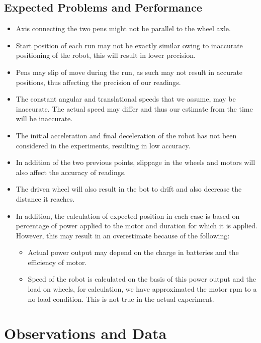 \documentclass[10pt,a4paper]{article}
\begin{document}
	\subsection{Expected Problems and Performance}
		\begin{itemize}
			\item Axis connecting the two pens might not be parallel to the wheel axle.
			\item Start position of each run may not be exactly similar owing to inaccurate positioning of the robot, this will result in lower precision.
			\item Pens may slip of move during the run, as such may not result in accurate positions, thus affecting the precision of our readings.
			\item The constant angular and translational speeds that we assume, may be inaccurate. The actual speed may differ and thus our estimate from the time will be inaccurate.
			\item The initial acceleration and final deceleration of the robot has not been considered in the experiments, resulting in low accuracy.
			\item In addition of the two previous points, slippage in the wheels and motors will also affect the accuracy of readings.
			\item The driven wheel will also result in the bot to drift and also decrease the distance it reaches.
			\item In addition, the calculation of expected position in each case is based on percentage of power applied to the motor and duration for which it is applied. However, this may result in an overestimate because of the following:
				\begin{itemize}
					\item Actual power output may depend on the charge in batteries and the efficiency of motor.
					\item Speed of the robot is calculated on the basis of this power output and the load on wheels, for calculation, we have approximated the motor rpm to a no-load condition. This is not true in the actual experiment.
				\end{itemize} 
		\end{itemize}
	\section{Observations and Data}
\end{document}
